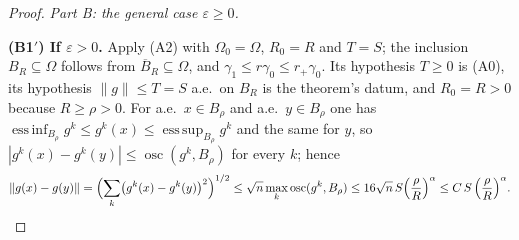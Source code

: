 \begin{proof}
\medskip
\noindent\emph{Part B: the general case $\varepsilon\ge0$.}

\textbf{(B1$'$) If $\varepsilon>0$.}  Apply (A2) with
$\Omega_0=\Omega$, $R_0=R$ and $T=S$; the inclusion $B_R\subseteq\Omega$ follows
from $\overline B_R\subseteq\Omega$, and $\gamma_1\le r\gamma_0\le r_+\gamma_0$.
Its hypothesis $T\ge0$ is (A0), its hypothesis $\|g\|\le T=S$ a.e.\ on $B_R$
is the theorem's datum, and $R_0=R>0$ because $R\ge\rho>0$.
For a.e.\ $x\in B_\rho$ and a.e.\ $y\in B_\rho$ one has
$\operatorname{ess\,inf}_{B_\rho}g^k\le g^k(x)\le
\operatorname{ess\,sup}_{B_\rho}g^k$ and the same for $y$, so
$|g^k(x)-g^k(y)|\le\operatorname*{osc}(g^k,B_\rho)$ for every $k$; hence
\[
\|g(x)-g(y)\|=\Bigl(\sum_k\bigl(g^k(x)-g^k(y)\bigr)^2\Bigr)^{1/2}
\le\sqrt n\max_k\operatorname*{osc}(g^k,B_\rho)
\le16\sqrt n\,S\Bigl(\frac\rho R\Bigr)^{\alpha}
\le C\,S\,\Bigl(\frac\rho R\Bigr)^{\alpha}.
\]


\end{proof}
